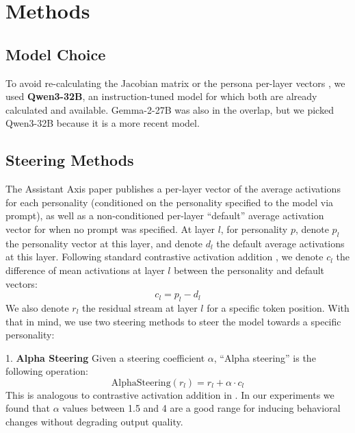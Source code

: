 \section{Methods}
\label{sec:methods}
\subsection{Model Choice}
To avoid re-calculating the Jacobian matrix \citep{gurnee2026global} or the persona per-layer vectors \citep{lu2026assistant},
we used \textbf{Qwen3-32B}, an instruction-tuned model for which both are already calculated and available. Gemma-2-27B was also in the overlap, but
we picked Qwen3-32B because it is a more recent model.

\subsection{Steering Methods}
The Assistant Axis paper publishes a per-layer vector of the average activations
for each personality (conditioned on the personality specified to the model via prompt), as well as a non-conditioned
per-layer ``default'' average activation vector for when no prompt was specified. At layer $l$, for personality $p$, denote $p_l$ the personality vector at this layer, and denote $d_l$ the default
average activations at this layer. Following standard contrastive activation addition \citep{panickssery2024caa}, we denote $c_l$ the difference of mean activations at layer $l$ between the personality and default vectors:
\[
{c}_l = p_l - d_l
\]
We also denote $r_l$ the residual stream at layer $l$ for a specific token position. With that in mind, we use two steering methods to steer the model towards a specific personality:


1. \textbf{Alpha Steering} Given a steering coefficient $\alpha$, ``Alpha steering'' is the following operation:
\[
\mathrm{AlphaSteering}(r_l) = r_l + \alpha \cdot {c}_l
\]
This is analogous to contrastive activation addition in \citet{panickssery2024caa}. In our experiments we found that $\alpha$ values between 1.5 and 4 are a good range for inducing behavioral changes without degrading output quality.

